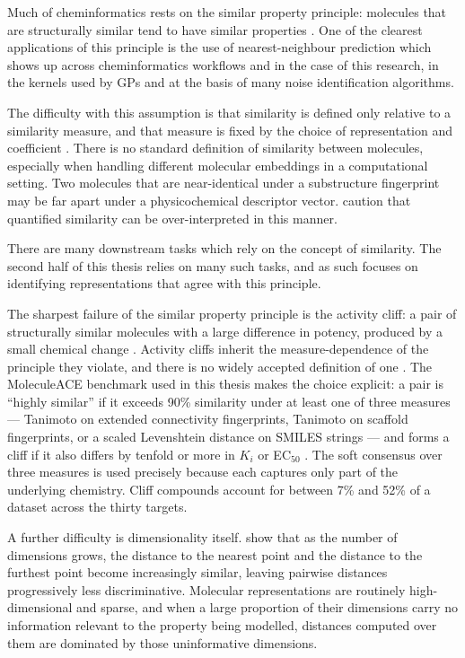 Much of cheminformatics rests on the similar property principle: molecules that are structurally similar tend to have similar properties \citep{Johnson1990, vanTilborg2022}. 
One of the clearest applications of this principle is the use of nearest-neighbour prediction which shows up across cheminformatics workflows and in the case of this research, in the kernels used by GPs and at the basis of many noise identification algorithms.

The difficulty with this assumption is that similarity is defined only relative to a similarity measure, and that measure is fixed by the choice of representation and
coefficient \citep{Maggiora2014}. There is no standard definition of similarity between molecules, especially when handling different molecular embeddings in a computational setting. Two molecules that are near-identical under a substructure fingerprint may be far apart under a physicochemical descriptor vector. \citet{Maggiora2014} caution that quantified similarity can be over-interpreted in this manner. 

There are many downstream tasks which rely on the concept of similarity. The second half of this thesis relies on many such tasks, and as such focuses on identifying representations that agree with this principle. 


The sharpest failure of the similar property principle is the activity cliff: a pair of structurally similar molecules with a large difference in potency, produced by a small
chemical change \citep{Maggiora2006, Stumpfe2012}. Activity cliffs inherit the measure-dependence of the principle they violate, and there is no widely accepted definition of one
\citep{vanTilborg2022}. The MoleculeACE benchmark used in this thesis makes the choice explicit: a pair is ``highly similar'' if it exceeds 90\% similarity under at least one of
three measures --- Tanimoto on extended connectivity fingerprints, Tanimoto on scaffold fingerprints, or a scaled Levenshtein distance on SMILES strings --- and forms a cliff if
it also differs by tenfold or more in $K_i$ or EC$_{50}$ \citep{vanTilborg2022}. The soft consensus over three measures is used precisely because each captures only part of the
underlying chemistry. Cliff compounds account for between 7\% and 52\% of a dataset across the thirty targets.

A further difficulty is dimensionality itself. \citet{Aggarwal2001} show that as the number of dimensions grows, the distance to the nearest point and the distance to the furthest
point become increasingly similar, leaving pairwise distances progressively less discriminative. Molecular representations are routinely high-dimensional and sparse, and when a
large proportion of their dimensions carry no information relevant to the property being modelled, distances computed over them are dominated by those uninformative dimensions.


